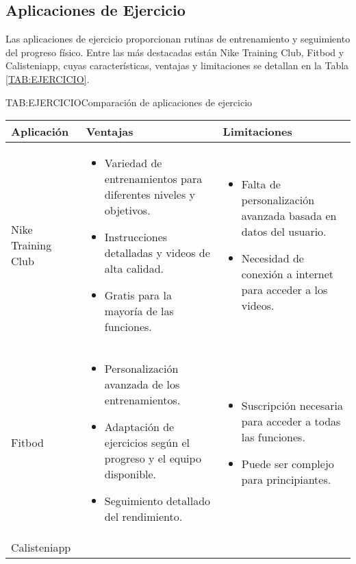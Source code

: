 \subsection{Aplicaciones de Ejercicio}

Las aplicaciones de ejercicio proporcionan rutinas de entrenamiento y seguimiento del progreso físico. Entre las más destacadas están Nike Training Club, Fitbod y Calisteniapp, cuyas características, ventajas y limitaciones se detallan en la Tabla \ref{TAB:EJERCICIO}.

\begin{table}[Comparación de aplicaciones de ejercicio]{TAB:EJERCICIO}{Comparación de aplicaciones de ejercicio}
  \begin{tabular}{|p{3cm}|p{5cm}|p{5cm}|}
    \hline
    \textbf{Aplicación} & \textbf{Ventajas} & \textbf{Limitaciones} \\
    \hline
    Nike Training Club & \begin{itemize}
      \item Variedad de entrenamientos para diferentes niveles y objetivos.
      \item Instrucciones detalladas y videos de alta calidad.
      \item Gratis para la mayoría de las funciones.
    \end{itemize} & \begin{itemize}
      \item Falta de personalización avanzada basada en datos del usuario.
      \item Necesidad de conexión a internet para acceder a los videos.
    \end{itemize} \\
    \hline
    Fitbod & \begin{itemize}
      \item Personalización avanzada de los entrenamientos.
      \item Adaptación de ejercicios según el progreso y el equipo disponible.
      \item Seguimiento detallado del rendimiento.
    \end{itemize} & \begin{itemize}
      \item Suscripción necesaria para acceder a todas las funciones.
      \item Puede ser complejo para principiantes.
    \end{itemize} \\
    \hline
    Calisteniapp & \begin{itemize}

\end{itemize}
\end{tabular}
\end{table}
